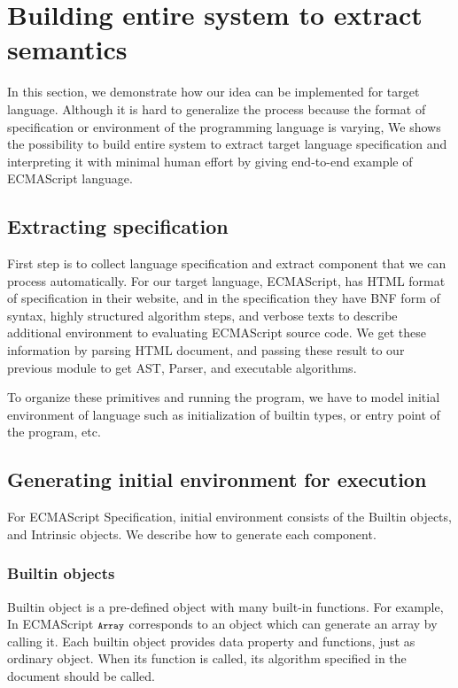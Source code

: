 \section{Building entire system to extract semantics}\label{sec:framework}

In this section, we demonstrate how our idea can be implemented for target language. Although it is hard to generalize the process because the format of specification or
environment of the programming language is varying, We shows the possibility to build entire system to extract target language specification and interpreting it with minimal human effort by giving end-to-end example of ECMAScript language.

\subsection{Extracting specification}
First step is to collect language specification and extract component that we can process automatically. For our target language, ECMAScript, has HTML format of specification in their website, and
in the specification they have BNF form of syntax, highly structured algorithm steps, and verbose texts to describe additional environment to evaluating ECMAScript source code.
We get these information by parsing HTML document, and passing these result to our previous module to get AST, Parser, and executable algorithms.

To organize these primitives and running the program, we have to model initial environment of language such as initialization of builtin types, or entry point of the program, etc.

\subsection{Generating initial environment for execution}
For ECMAScript Specification, initial environment consists of the Builtin objects, and Intrinsic objects. We describe how to generate each component.

\subsubsection{Builtin objects}

 Builtin object is a pre-defined object with many built-in functions. For example, In ECMAScript \( \texttt{\footnotesize Array} \) corresponds to an object which can generate an array by
 calling it. Each builtin object provides data property and functions, just as ordinary object. When its function is called,
 its algorithm specified in the document should be called.
 
